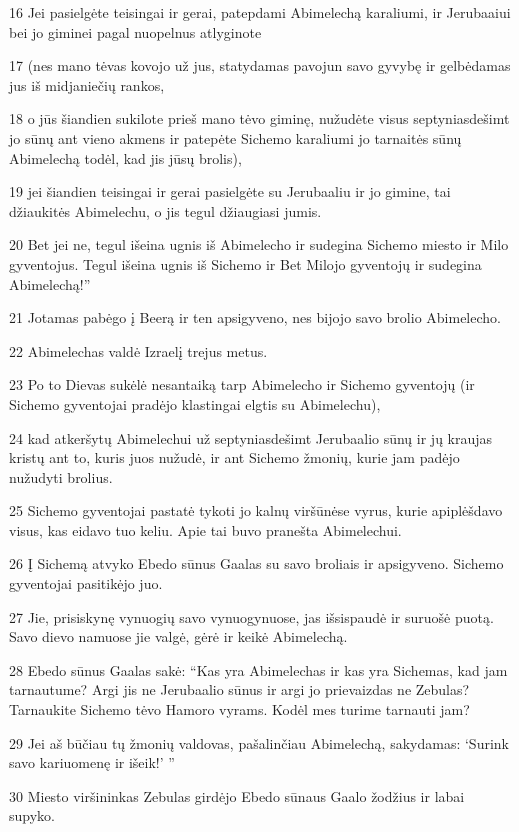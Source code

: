 \par 16 Jei pasielgėte teisingai ir gerai, patepdami Abimelechą karaliumi, ir Jerubaaiui bei jo giminei pagal nuopelnus atlyginote 
\par 17 (nes mano tėvas kovojo už jus, statydamas pavojun savo gyvybę ir gelbėdamas jus iš midjaniečių rankos, 
\par 18 o jūs šiandien sukilote prieš mano tėvo giminę, nužudėte visus septyniasdešimt jo sūnų ant vieno akmens ir patepėte Sichemo karaliumi jo tarnaitės sūnų Abimelechą todėl, kad jis jūsų brolis), 
\par 19 jei šiandien teisingai ir gerai pasielgėte su Jerubaaliu ir jo gimine, tai džiaukitės Abimelechu, o jis tegul džiaugiasi jumis. 
\par 20 Bet jei ne, tegul išeina ugnis iš Abimelecho ir sudegina Sichemo miesto ir Milo gyventojus. Tegul išeina ugnis iš Sichemo ir Bet Milojo gyventojų ir sudegina Abimelechą!” 
\par 21 Jotamas pabėgo į Beerą ir ten apsigyveno, nes bijojo savo brolio Abimelecho. 
\par 22 Abimelechas valdė Izraelį trejus metus. 
\par 23 Po to Dievas sukėlė nesantaiką tarp Abimelecho ir Sichemo gyventojų (ir Sichemo gyventojai pradėjo klastingai elgtis su Abimelechu), 
\par 24 kad atkeršytų Abimelechui už septyniasdešimt Jerubaalio sūnų ir jų kraujas kristų ant to, kuris juos nužudė, ir ant Sichemo žmonių, kurie jam padėjo nužudyti brolius. 
\par 25 Sichemo gyventojai pastatė tykoti jo kalnų viršūnėse vyrus, kurie apiplėšdavo visus, kas eidavo tuo keliu. Apie tai buvo pranešta Abimelechui. 
\par 26 Į Sichemą atvyko Ebedo sūnus Gaalas su savo broliais ir apsigyveno. Sichemo gyventojai pasitikėjo juo. 
\par 27 Jie, prisiskynę vynuogių savo vynuogynuose, jas išsispaudė ir suruošė puotą. Savo dievo namuose jie valgė, gėrė ir keikė Abimelechą. 
\par 28 Ebedo sūnus Gaalas sakė: “Kas yra Abimelechas ir kas yra Sichemas, kad jam tarnautume? Argi jis ne Jerubaalio sūnus ir argi jo prievaizdas ne Zebulas? Tarnaukite Sichemo tėvo Hamoro vyrams. Kodėl mes turime tarnauti jam? 
\par 29 Jei aš būčiau tų žmonių valdovas, pašalinčiau Abimelechą, sakydamas: ‘Surink savo kariuomenę ir išeik!’ ” 
\par 30 Miesto viršininkas Zebulas girdėjo Ebedo sūnaus Gaalo žodžius ir labai supyko. 
